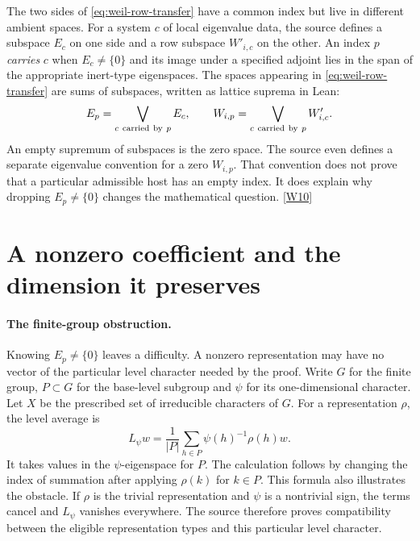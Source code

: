 \documentclass[12pt,letterpaper]{article}
\begin{document}
The two sides of \eqref{eq:weil-row-transfer} have a common index but live in different ambient spaces. For a system \(c\) of local eigenvalue data, the source defines a subspace \(E_c\) on one side and a row subspace \(W'_{i,c}\) on the other. An index \(p\) \emph{carries} \(c\) when \(E_c\ne\{0\}\) and its image under a specified adjoint lies in the span of the appropriate inert-type eigenspaces. The spaces appearing in \eqref{eq:weil-row-transfer} are sums of subspaces, written as lattice suprema in Lean:
\[
 E_p=\bigvee_{c\ {\rm carried\ by}\ p}E_c,\qquad
 W_{i,p}=\bigvee_{c\ {\rm carried\ by}\ p}W'_{i,c}.
\]
An empty supremum of subspaces is the zero space. The source even defines a separate eigenvalue convention for a zero \(W_{i,p}\). That convention does not prove that a particular admissible host has an empty index. It does explain why dropping \(E_p\ne\{0\}\) changes the mathematical question. \href{https://github.com/nousentllc/riemann-hypothesis/blob/40e56bab026552e089d7afcfeff08d2defb9c005/src/Formalism/LocalToGlobal/IndefiniteReal/ZeroPartEigenvalueConvention.lean#L103-L213}{\textsf{[W10]}}

\section{A nonzero coefficient and the dimension it preserves}
\label{sec:weil-coefficient}

\paragraph{The finite-group obstruction.}
Knowing \(E_p\ne\{0\}\) leaves a difficulty. A nonzero representation may have no vector of the particular level character needed by the proof. Write \(G\) for the finite group, \(P\subset G\) for the base-level subgroup and \(\psi\) for its one-dimensional character. Let \(X\) be the prescribed set of irreducible characters of \(G\). For a representation \(\rho\), the level average is
\[
    L_\psi w=\frac1{|P|}\sum_{h\in P}\psi(h)^{-1}\rho(h)w .
\]
It takes values in the \(\psi\)-eigenspace for \(P\). The calculation follows by changing the index of summation after applying \(\rho(k)\) for \(k\in P\). This formula also illustrates the obstacle. If \(\rho\) is the trivial representation and \(\psi\) is a nontrivial sign, the terms cancel and \(L_\psi\) vanishes everywhere. The source therefore proves compatibility between the eligible representation types and this particular level character.
\end{document}
